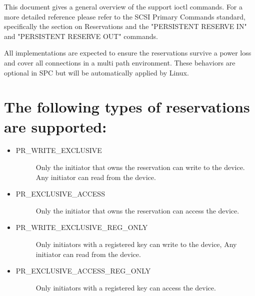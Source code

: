 \documentclass[a4paper,11pt,english]{sphinxmanual}
\begin{document}
This document gives a general overview of the support ioctl commands.
For a more detailed reference please refer to the SCSI Primary
Commands standard, specifically the section on Reservations and the
"PERSISTENT RESERVE IN" and "PERSISTENT RESERVE OUT" commands.

All implementations are expected to ensure the reservations survive
a power loss and cover all connections in a multi path environment.
These behaviors are optional in SPC but will be automatically applied
by Linux.


\section{The following types of reservations are supported:}
\label{\detokenize{pr:the-following-types-of-reservations-are-supported}}\begin{itemize}
\item {} \begin{description}
\item[{PR\_WRITE\_EXCLUSIVE}] \leavevmode
Only the initiator that owns the reservation can write to the
device.  Any initiator can read from the device.

\end{description}

\item {} \begin{description}
\item[{PR\_EXCLUSIVE\_ACCESS}] \leavevmode
Only the initiator that owns the reservation can access the
device.

\end{description}

\item {} \begin{description}
\item[{PR\_WRITE\_EXCLUSIVE\_REG\_ONLY}] \leavevmode
Only initiators with a registered key can write to the device,
Any initiator can read from the device.

\end{description}

\item {} \begin{description}
\item[{PR\_EXCLUSIVE\_ACCESS\_REG\_ONLY}] \leavevmode
Only initiators with a registered key can access the device.

\end{description}


\end{itemize}
\end{document}
